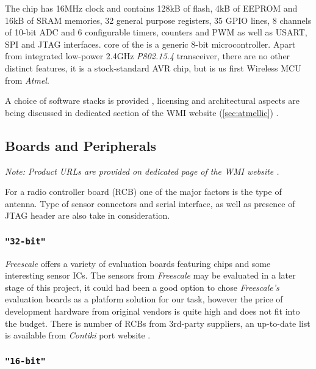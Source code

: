  The  \cite{atmel:atmega128rfa1:datasheet} chip
 has 16MHz clock and contains 128kB of flash, 4kB of EEPROM and 16kB
 of SRAM memories, 32 general purpose registers, 35 GPIO lines, 8
 channels of 10-bit ADC and 6 configurable timers, counters and PWM
 as well as USART, SPI and JTAG interfaces.  core
 of the  is a generic 8-bit microcontroller.
 Apart from integrated  \cite{atmel:at86rf231:datasheet}
 low-power 2.4GHz \emph{P802.15.4} transceiver, there are no other
 distinct features, it is a stock-standard AVR chip, but is us first
 Wireless MCU from \emph{Atmel}.

 A choice of software stacks is provided \cite{atmel:avr2070,
 atmel:avr2025, atmel:avr2102, atmel:zbpro}, licensing and architectural
 aspects are being discussed in dedicated section of the WMI website
 (\ref{sec:atmellic}) \cite{wmi:wiki:atmelsw}.

\subsection{Boards and Peripherals}

 \emph{Note: Product URLs are provided on dedicated page of the WMI
 website \cite{wmi:wiki:devhw}.}
 \newline

 For a radio controller board (RCB) one of the major factors is the
 type of antenna. Type of sensor connectors and serial interface,
 as well as presence of JTAG header are also take in consideration.

\subsubsection{\texttt{"32-bit"}}

 \emph{Freescale} offers a variety of evaluation boards featuring
  chips and some interesting sensor ICs. The sensors
 from \emph{Freescale} may be evaluated in a later stage of this
 project, it could had been a good option to chose \emph{Freescale's}
 evaluation boards as a platform solution for our task, however the
 price of development hardware from original vendors is quite high
 and does not fit into the budget. There is number of 
 RCBs from 3rd-party suppliers, an up-to-date list is available
 from \emph{Contiki}  port website
 \cite{links:contiki:rcb:mc1322x}.

\subsubsection{\texttt{"16-bit"}}

